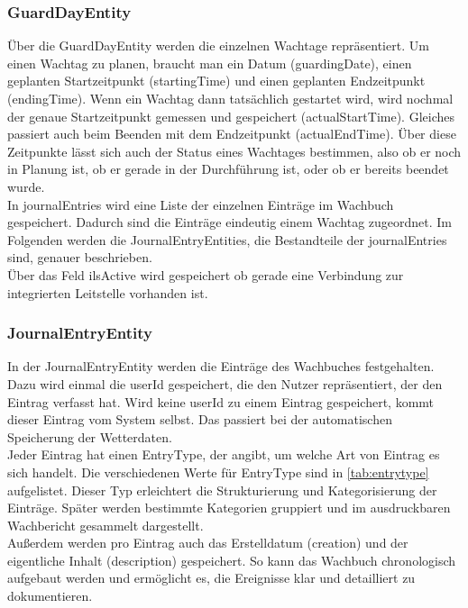 \documentclass[fontsize=12pt,openright,oneside,paper=a4,BCOR=1cm]{scrbook}
\begin{document}
\subsubsection{GuardDayEntity}
Über die \glqq GuardDayEntity\grqq{} werden die einzelnen Wachtage repräsentiert. Um einen Wachtag zu planen, braucht man ein Datum (\glqq guardingDate\grqq{}), einen geplanten Startzeitpunkt (\glqq startingTime\grqq{}) und einen geplanten Endzeitpunkt (\glqq endingTime\grqq{}). Wenn ein Wachtag dann tatsächlich gestartet wird, wird nochmal der genaue Startzeitpunkt gemessen und gespeichert (\glqq actualStartTime\grqq{}). Gleiches passiert auch beim Beenden mit dem Endzeitpunkt (\glqq actualEndTime\grqq{}). Über diese Zeitpunkte lässt sich auch der Status eines Wachtages bestimmen, also ob er noch in Planung ist, ob er gerade in der Durchführung ist, oder ob er bereits beendet wurde. \\ 
In \glqq journalEntries\grqq{} wird eine Liste der einzelnen Einträge im Wachbuch gespeichert. Dadurch sind die Einträge eindeutig einem Wachtag zugeordnet. Im Folgenden werden die \glqq JournalEntryEntities\grqq{}, die Bestandteile der \glqq journalEntries\grqq{} sind, genauer beschrieben. \\
Über das Feld \glqq ilsActive\grqq{} wird gespeichert ob gerade eine Verbindung zur integrierten Leitstelle vorhanden ist.  
 
 \subsubsection{JournalEntryEntity}
In der \glqq JournalEntryEntity\grqq{} werden die Einträge des Wachbuches festgehalten. Dazu wird einmal die \glqq userId\grqq{} gespeichert, die den Nutzer repräsentiert, der den Eintrag verfasst hat. Wird keine \glqq userId\grqq{} zu einem Eintrag gespeichert, kommt dieser Eintrag vom System selbst. Das passiert bei der automatischen Speicherung der Wetterdaten. \\
Jeder Eintrag hat einen \glqq EntryType\grqq{}, der angibt, um welche Art von Eintrag es sich handelt. Die verschiedenen Werte für \glqq EntryType\grqq{} sind in \ref{tab:entrytype} aufgelistet. Dieser Typ erleichtert die Strukturierung und Kategorisierung der Einträge. Später werden bestimmte Kategorien gruppiert und im ausdruckbaren Wachbericht gesammelt dargestellt. \\
Außerdem werden pro Eintrag auch das Erstelldatum (\glqq creation\grqq{}) und der eigentliche Inhalt (\glqq description\grqq{}) gespeichert. So kann das Wachbuch chronologisch aufgebaut werden und ermöglicht es, die Ereignisse klar und detailliert zu dokumentieren.
\end{document}
